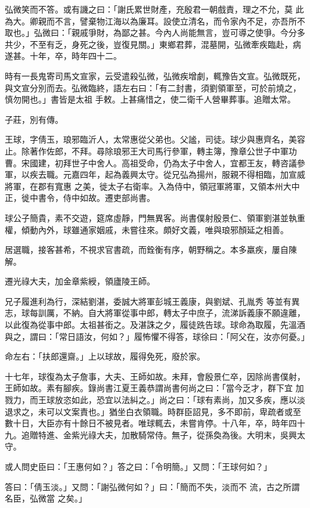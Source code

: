 \begin{pinyinscope}
 弘微笑而不答。或有譏之曰：「謝氏累世財產，充殷君一朝戲責，理之不允，莫
 此為大。卿親而不言，譬棄物江海以為廉耳。設使立清名，而令家內不足，亦吾所不取也。」弘微曰：「親戚爭財，為鄙之甚。今內人尚能無言，豈可導之使爭。今分多共少，不至有乏，身死之後，豈復見關。」東鄉君葬，混墓開，弘微牽疾臨赴，病遂甚。十年，卒，時年四十二。



 時有一長鬼寄司馬文宣家，云受遣殺弘微，弘微疾增劇，輒豫告文宣。弘微既死，與文宣分別而去。弘微臨終，語左右曰：「有二封書，須劉領軍至，可於前燒之，慎勿開也。」書皆是太祖
 手敕。上甚痛惜之，使二衛千人營畢葬事。追贈太常。



 子莊，別有傳。



 王球，字倩玉，琅邪臨沂人，太常惠從父弟也。父謐，司徒。球少與惠齊名，美容止。除著作佐郎，不拜。尋除琅邪王大司馬行參軍，轉主簿，豫章公世子中軍功曹。宋國建，初拜世子中舍人。高祖受命，仍為太子中舍人，宜都王友，轉咨議參軍，以疾去職。元嘉四年，起為義興太守。從兄弘為揚州，服親不得相臨，加宣威將軍，在郡有寬惠
 之美，徙太子右衛率。入為侍中，領冠軍將軍，又領本州大中正，徙中書令，侍中如故。遷吏部尚書。



 球公子簡貴，素不交遊，筵席虛靜，門無異客。尚書僕射殷景仁、領軍劉湛並執重權，傾動內外，球雖通家姻戚，未嘗往來。頗好文義，唯與琅邪顏延之相善。



 居選職，接客甚希，不視求官書疏，而銓衡有序，朝野稱之。本多羸疾，屢自陳解。



 遷光祿大夫，加金章紫綬，領廬陵王師。



 兄子履進利為行，深結劉湛，委誠大將軍彭城王義康，與劉斌、孔胤秀
 等並有異志，球每訓厲，不納。自大將軍從事中郎，轉太子中庶子，流涕訴義康不願違離，以此復為從事中郎。太祖甚銜之。及湛誅之夕，履徒跣告球。球命為取履，先溫酒與之，謂曰：「常日語汝，何如？」履怖懼不得答，球徐曰：「阿父在，汝亦何憂。」



 命左右：「扶郎還齋。」上以球故，履得免死，廢於家。



 十七年，球復為太子詹事，大夫、王師如故。未拜，會殷景仁卒，因除尚書僕射，王師如故。素有腳疾。錄尚書江夏王義恭謂尚書何尚之曰：「當今乏才，群下宜
 加戮力，而王球放恣如此，恐宜以法糾之。」尚之曰：「球有素尚，加又多疾，應以淡退求之，未可以文案責也。」猶坐白衣領職。時群臣詔見，多不即前，卑疏者或至數十日，大臣亦有十餘日不被見者。唯球輒去，未嘗肯停。十八年，卒，時年四十九。追贈特進、金紫光祿大夫，加散騎常侍。無子，從孫奐為後。大明末，吳興太守。



 或人問史臣曰：「王惠何如？」答之曰：「令明簡。」又問：「王球何如？」



 答曰：「倩玉淡。」又問：「謝弘微何如？」曰：「簡而不失，淡而不
 流，古之所謂名臣，弘微當
 之矣。」



\end{pinyinscope}
